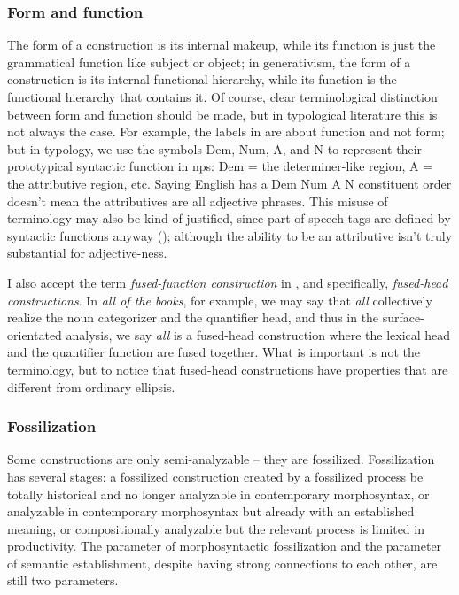 \documentclass[UTF8, a4paper, oneside, scheme=plain, 12pt]{ctexbook}
\newcommand*{\term}[1]{\emph{#1}}
\newcommand{\form}[1]{\emph{#1}}
\begin{document}
{\subsubsection{Form and function}

The form of a construction is its internal makeup, 
while its function is just the grammatical function like subject or object;
in generativism, 
the form of a construction is its internal functional hierarchy, 
while its function is the functional hierarchy that contains it.
Of course, clear terminological distinction between form and function 
should be made, 
but in typological literature this is not always the case. 
For example, the labels in  are about function and not form;
but in typology, we use the symbols Dem, Num, A, and N to represent
their prototypical syntactic function in \acs{np}s:
Dem = the determiner-like region, 
A = the attributive region, etc. 
Saying English has a Dem Num A N constituent order 
doesn't mean the attributives are all adjective phrases.
This misuse of terminology may also be kind of justified,
since part of speech tags are defined by syntactic functions anyway
(); 
although the ability to be an attributive isn't truly substantial 
for adjective-ness.

I also accept the term \term{fused-function construction} in \citet{cgel},
and specifically, \form{fused-head constructions}.
In \form{all of the books}, for example, 
we may say that \form{all} collectively realize the noun categorizer and the quantifier head, 
and thus in the surface-orientated analysis, 
we say \form{all} is a fused-head construction 
where the lexical head and the quantifier function are fused together.
What is important is not the terminology,
but to notice that fused-head constructions 
have properties that are different from 
ordinary ellipsis. 

\subsubsection{Fossilization}

Some constructions are only semi-analyzable -- 
they are fossilized.
Fossilization has several stages:
a fossilized construction created by a fossilized process 
be totally historical and no longer analyzable in contemporary morphosyntax,
or analyzable in contemporary morphosyntax but already with an established meaning,
or compositionally analyzable but the relevant process is limited in productivity.
The parameter of morphosyntactic fossilization 
and the parameter of semantic establishment,
despite having strong connections to each other,
are still two parameters.

}
\end{document}
